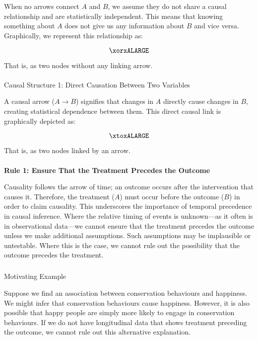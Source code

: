 \documentclass[
  singlecolumn]{article}
\makeatletter
\let\oldparagraph\paragraph
\renewcommand{\paragraph}{
    \@ifstar
      \xxxParagraphStar
      \xxxParagraphNoStar
  }
\newcommand{\xxxParagraphStar}[1]{\oldparagraph*{#1}\mbox{}}
\newcommand{\xxxParagraphNoStar}[1]{\oldparagraph{#1}\mbox{}}
\let\oldsubparagraph\subparagraph
\renewcommand{\subparagraph}{
    \@ifstar
      \xxxSubParagraphStar
      \xxxSubParagraphNoStar
  }
\newcommand{\xxxSubParagraphStar}[1]{\oldsubparagraph*{#1}\mbox{}}
\newcommand{\xxxSubParagraphNoStar}[1]{\oldsubparagraph{#1}\mbox{}}
\makeatother
\begin{document}
When no arrows connect \(A\) and \(B\), we assume they do not share a
causal relationship and are statistically independent. This means that
knowing something about \(A\) does not give us any information about
\(B\) and vice versa. Graphically, we represent this relationship as:

\[
\xorxALARGE
\]

That is, as two nodes without any linking arrow.

\paragraph{Causal Structure 1: Direct Causation Between Two
Variables}\label{causal-structure-1-direct-causation-between-two-variables}

A causal arrow (\(A \to B\)) signifies that changes in \(A\) directly
cause changes in \(B\), creating statistical dependence between them.
This direct causal link is graphically depicted as:

\[
\xtoxALARGE
\]

That is, as two nodes linked by an arrow.

\paragraph{\texorpdfstring{\textbf{Rule 1: Ensure That the Treatment
Precedes the
Outcome}}{Rule 1: Ensure That the Treatment Precedes the Outcome}}\label{sec-four-rules}

Causality follows the arrow of time; an outcome occurs after the
intervention that causes it. Therefore, the treatment (\(A\)) must occur
before the outcome (\(B\)) in order to claim causality. This underscores
the importance of temporal precedence in causal inference. Where the
relative timing of events is unknown---as it often is in observational
data---we cannot ensure that the treatment precedes the outcome unless
we make additional assumptions. Such assumptions may be implausible or
untestable. Where this is the case, we cannot rule out the possibility
that the outcome precedes the treatment.

\subparagraph{Motivating Example}\label{motivating-example}

Suppose we find an association between conservation behaviours and
happiness. We might infer that conservation behaviours cause happiness.
However, it is also possible that happy people are simply more likely to
engage in conservation behaviours. If we do not have longitudinal data
that shows treatment preceding the outcome, we cannot rule out this
alternative explanation.
\end{document}
